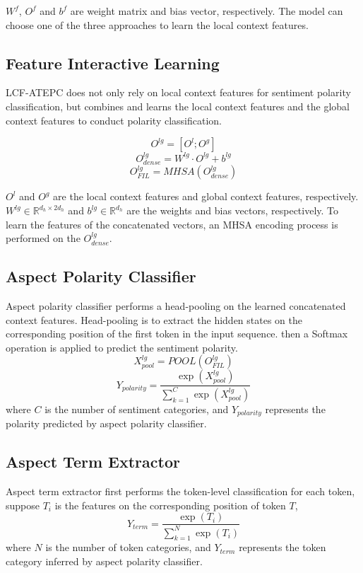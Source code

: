 \documentclass[a4paper,fleqn]{cas-sc}
\begin{document}
$W^{f}$, $O^{f}$ and $b^{f}$ are weight matrix and bias vector, respectively. The model can choose one of the three approaches to learn the local context features.
\subsection{Feature Interactive Learning}

LCF-ATEPC does not only rely on local context features for sentiment polarity classification, but combines and learns the local context features and the global context features to conduct polarity classification.

\begin{equation}
O^{l g}=\left[O^{l} ; O^{g}\right]
\end{equation}
\begin{equation}
O_{dense}^{l g} = W^{lg} \cdot O^{lg} + b^{lg}
\label{dense}
\end{equation}
\begin{equation}
O_{FIL}^{l g}=M H S A\left(O_{dense}^{lg}\right)
\end{equation}

$O^{l} $ and $ O^{g}$ are the local context features and global context features, respectively. $ W^{lg} \in \mathbb{R}^{d_{h} \times 2d_{h}}$ and $ b^{lg} \in \mathbb{R}^{d_{h}}$ are the weights and bias vectors, respectively. To learn the features of the concatenated vectors, an MHSA encoding process is performed on the $O_{dense}^{l g}$. 

\subsection{Aspect Polarity Classifier}
Aspect polarity classifier performs a head-pooling on the learned concatenated context features. Head-pooling is to extract the hidden states on the corresponding position of the first token in the input sequence. then a Softmax operation is applied to predict the sentiment polarity.
\begin{equation}
X_{pool}^{lg}=POOL\left(O_{FIL}^{l g}\right)
\end{equation}
\begin{equation}
Y_{polarity}=\frac{\exp (X_{pool}^{l g})} {\sum_{k=1}^{C}\exp(X_{pool}^{lg})}
\end{equation}
where $C$ is the number of sentiment categories, and $Y_{polarity}$ represents the polarity predicted by aspect polarity classifier.

\subsection{Aspect Term Extractor}
Aspect term extractor first performs the token-level classification for each token, suppose $T_{i}$ is the features on the corresponding position of token $T$,
\begin{equation}
Y_{term}=\frac{\exp (T_{i})} {\sum_{k=1}^{N}\exp(T_{i})}
\end{equation}
where $N$ is the number of token categories, and $Y_{term}$ represents the token category inferred by aspect polarity classifier.
\end{document}

